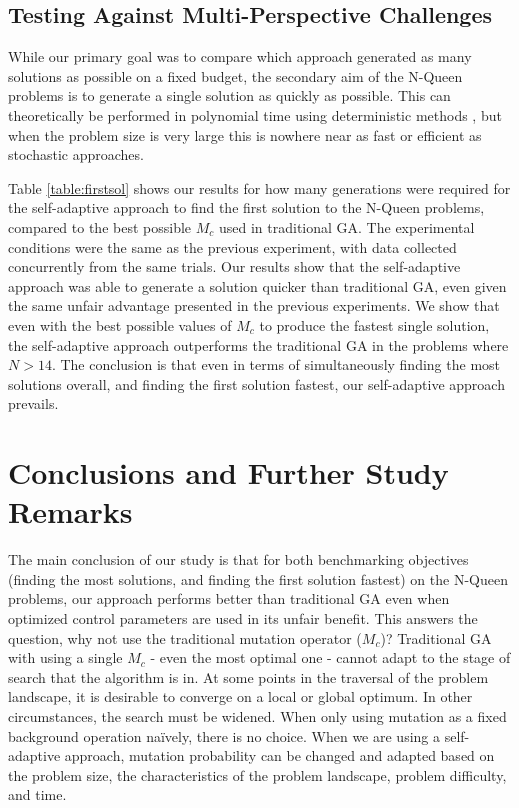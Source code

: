 \documentclass[conference]{IEEEtran}
\begin{document}
\subsection{Testing Against Multi-Perspective Challenges}
While our primary goal was to compare which approach generated as many solutions as possible on a fixed budget, the secondary aim of the N-Queen problems is to generate a single solution as quickly as possible. This can theoretically be performed in polynomial time using deterministic methods \cite{cit:22,cit:23}, but when the problem size is very large this is nowhere near as fast or efficient as stochastic approaches.

Table \ref{table:firstsol} shows our results for how many generations were required for the self-adaptive approach to find the first solution to the N-Queen problems, compared to the best possible $M_{c}$ used in traditional GA. The experimental conditions were the same as the previous experiment, with data collected concurrently from the same trials. Our results show that the self-adaptive approach was able to generate a solution quicker than traditional GA, even given the same unfair advantage presented in the previous experiments. We show that even with the best possible values of $M_{c}$ to produce the fastest single solution, the self-adaptive approach outperforms the traditional GA in the problems where $N > 14$. The conclusion is that even in terms of simultaneously finding the most solutions overall, and finding the first solution fastest, our self-adaptive approach prevails.

\section{Conclusions and Further Study Remarks}
The main conclusion of our study is that for both benchmarking objectives (finding the most solutions, and finding the first solution fastest) on the N-Queen problems, our approach performs better than traditional GA even when optimized control parameters are used in its unfair benefit. This answers the question, why not use the traditional mutation operator ($M_{c}$)? Traditional GA with using a single $M_{c}$ - even the most optimal one - cannot adapt to the stage of search that the algorithm is in. At some points in the traversal of the problem landscape, it is desirable to converge on a local or global optimum. In other circumstances, the search must be widened. When only using mutation as a fixed background operation na\"{i}vely, there is no choice. When we are using a self-adaptive approach, mutation probability can be changed and adapted based on the problem size, the characteristics of the problem landscape, problem difficulty, and time.
\end{document}
